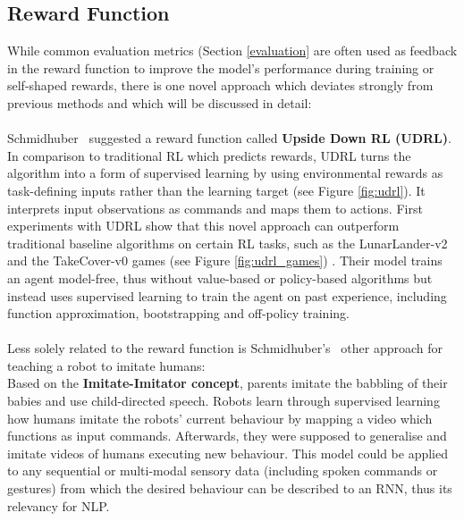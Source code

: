 \documentclass[11pt]{article}
\begin{document}
\subsection{Reward Function}\label{rewardfunction}
While common evaluation metrics (Section \ref{evaluation} are often used as feedback in the reward function to improve the model's performance during training \cite{ranzato2015sequence,wu-etal-2018-study,grissom-ii-etal-2014-dont,chen-bansal-2018-fast} or self-shaped rewards, there is one novel approach which deviates strongly from previous methods and which will be discussed in detail:\\\\
Schmidhuber~ suggested a reward function called \textbf{Upside Down RL (UDRL)}. In comparison to traditional RL which predicts rewards, UDRL turns the algorithm into a form of supervised learning by using environmental rewards as task-defining inputs rather than the learning target (see Figure \ref{fig:udrl}). It interprets input observations as commands and maps them to actions. First experiments with UDRL show that this novel approach can outperform traditional baseline algorithms on certain RL tasks, such as the LunarLander-v2 and the TakeCover-v0 games (see Figure \ref{fig:udrl_games}) \cite{srivastava2019training,openaigym,vizdoom}. Their model trains an agent model-free, thus without value-based or policy-based algorithms but instead uses supervised learning to train the agent on past experience, including function approximation, bootstrapping and off-policy training.\\\\
Less solely related to the reward function is Schmidhuber's~ other approach for teaching a robot to imitate humans:\\ Based on the \textbf{Imitate-Imitator concept}, parents imitate the babbling of their babies and use child-directed speech. Robots learn through supervised learning how humans imitate the robots' current behaviour by mapping a video which functions as input commands. Afterwards, they were supposed to generalise and imitate videos of humans executing new behaviour. This model could be applied to any sequential or multi-modal sensory data (including spoken commands or gestures) from which the desired behaviour can be described to an RNN, thus its relevancy for NLP. 
\end{document}
